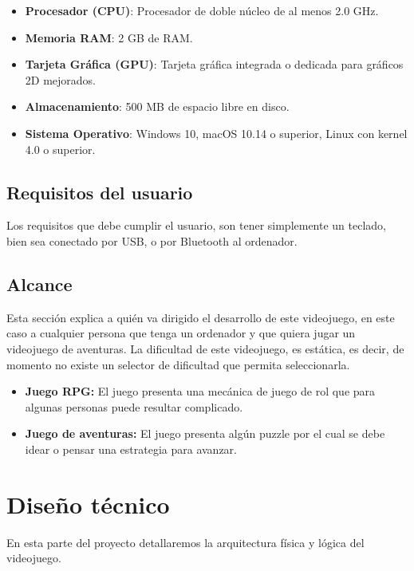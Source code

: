\documentclass[a4paper]{article}
\begin{document}
\begin{itemize}
    \item \textbf{Procesador (CPU)}: Procesador de doble núcleo de al menos 2.0 GHz.
    \item \textbf{Memoria RAM}: 2 GB de RAM.
    \item \textbf{Tarjeta Gráfica (GPU)}: Tarjeta gráfica integrada o dedicada para gráficos 2D mejorados.
    \item \textbf{Almacenamiento}: 500 MB de espacio libre en disco.
    \item \textbf{Sistema Operativo}: Windows 10, macOS 10.14 o superior, Linux con kernel 4.0 o superior.
\end{itemize}

\subsection{Requisitos del usuario}
Los requisitos que debe cumplir el usuario, son tener simplemente un teclado, bien sea conectado por USB, o por Bluetooth al ordenador.
\subsection{Alcance}
Esta sección explica a quién va dirigido el desarrollo de este videojuego, en este caso a cualquier persona que tenga un ordenador y que quiera jugar un videojuego de aventuras.
La dificultad de este videojuego, es estática, es decir, de momento no existe un selector de dificultad que permita seleccionarla.
\begin{itemize}
    \item \textbf{Juego RPG:} El juego presenta una mecánica de juego de rol que para algunas personas puede resultar complicado.
    \item \textbf{Juego de aventuras:} El juego presenta algún puzzle por el cual se debe idear o pensar una estrategia para avanzar.
\end{itemize}

\clearpage
\section{Diseño técnico}
En esta parte del proyecto detallaremos la arquitectura física y lógica del videojuego.
\end{document}
